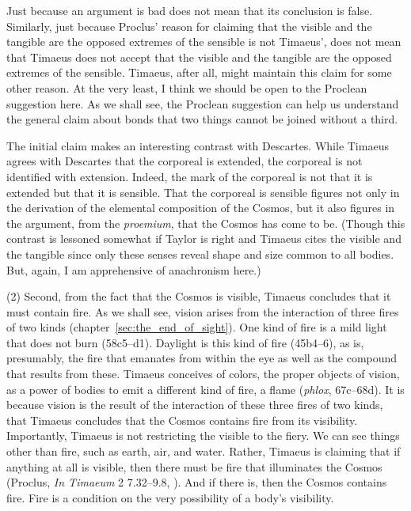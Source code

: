 Just because an argument is bad does not mean that its conclusion is false. Similarly, just because Proclus' reason for claiming that the visible and the tangible are the opposed extremes of the sensible is not Timaeus', does not mean that Timaeus does not accept that the visible and the tangible are the opposed extremes of the sensible. Timaeus, after all, might maintain this claim for some other reason. At the very least, I think we should be open to the Proclean suggestion here. As we shall see, the Proclean suggestion can help us understand the general claim about bonds that two things cannot be joined without a third.

The initial claim makes an interesting contrast with Descartes. While Timaeus agrees with Descartes that the corporeal is extended, the corporeal is not identified with extension. Indeed, the mark of the corporeal is not that it is extended but that it is sensible. That the corporeal is sensible figures not only in the derivation of the elemental composition of the Cosmos, but it also figures in the argument, from the \emph{proemium}, that the Cosmos has come to be. (Though this contrast is lessoned somewhat if Taylor is right and Timaeus cites the visible and the tangible since only these senses reveal shape and size common to all bodies. But, again, I am apprehensive of anachronism here.)

(2) Second, from the fact that the Cosmos is visible, Timaeus concludes that it must contain fire. As we shall see, vision arises from the interaction of three fires of two kinds (chapter~\ref{sec:the_end_of_sight}). One kind of fire is a mild light that does not burn (58c5–d1). Daylight is this kind of fire (45b4–6), as is, presumably, the fire that emanates from within the eye as well as the compound that results from these. Timaeus conceives of colors, the proper objects of vision, as a power of bodies to emit a different kind of fire, a flame (\emph{phlox}, 67c–68d). It is because vision is the result of the interaction of these three fires of two kinds, that Timaeus concludes that the Cosmos contains fire from its visibility. Importantly, Timaeus is not restricting the visible to the fiery. We can see things other than fire, such as earth, air, and water. Rather, Timaeus is claiming that if anything at all is visible, then there must be fire that illuminates the Cosmos (Proclus, \emph{In Timaeum} 2 7.32--9.8, \citealt{Diehl:1903re}). And if there is, then the Cosmos contains fire. Fire is a condition on the very possibility of a body's visibility.

